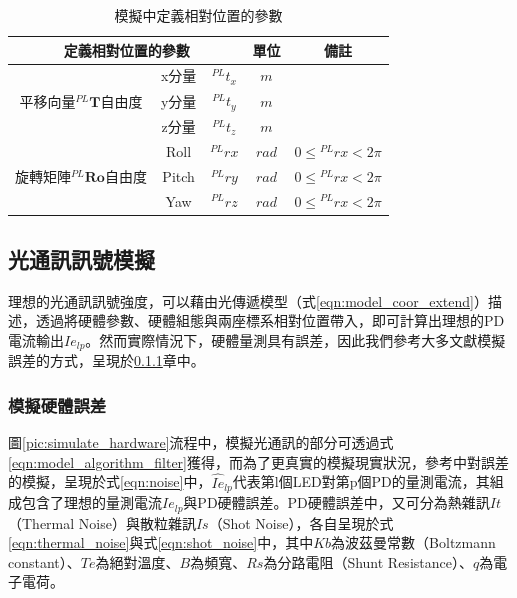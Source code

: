 \begin{table}[h]
    \renewcommand{\arraystretch}{1.3}
    \setlength{\arrayrulewidth}{0.15mm}
    \setlength{\doublerulesep}{0.12mm}
    \caption{模擬中定義相對位置的參數}
    \label{tab:para_relative}
    \centering
    \begin{tabular}{|c|cc|c|c|}
    \hline
    \multicolumn{3}{|c|}{\textbf{定義相對位置的參數}}  &\textbf{單位}  &  \textbf{備註}   \\
    \hline
    \multirow{3}{*}{平移向量$^{PL}\boldsymbol{T}$自由度} 
    & x分量 &$^{PL}t_x$ & $m$ &  \\
    & y分量 &$^{PL}t_y$ & $m$ &  \\
    & z分量 &$^{PL}t_z$ & $m$ &  \\
    \hline
    \multirow{3}{*}{旋轉矩陣$^{PL}\boldsymbol{Ro}$自由度} 
    & Roll &${^{PL}rx}$ & $rad$ &  $0\leq {^{PL}rx}<2\pi$\\
    & Pitch &$^{PL}ry$ & $rad$ & $0\leq {^{PL}rx}<2\pi$ \\
    & Yaw &$^{PL}rz$ & $rad$ & $0\leq {^{PL}rx}<2\pi$ \\
    \hline
    \end{tabular}
    \end{table}

\subsection{光通訊訊號模擬}
\label{chp:simulate_vlc}

    理想的光通訊訊號強度，可以藉由光傳遞模型（式\ref{eqn:model_coor_extend}）描述，透過將硬體參數、硬體組態與兩座標系相對位置帶入，即可計算出理想的PD電流輸出$Ie_{lp}$。然而實際情況下，硬體量測具有誤差，因此我們參考大多文獻模擬誤差的方式，呈現於\ref{chp:hardware_error}章中。

    \subsubsection{模擬硬體誤差}
    \label{chp:hardware_error}

    圖\ref{pic:simulate_hardware}流程中，模擬光通訊的部分可透過式\ref{eqn:model_algorithm_filter}獲得，而為了更真實的模擬現實狀況，參考\cite{survey_light2018}中對誤差的模擬，呈現於式\ref{eqn:noise}中，$\hat{Ie}_{lp}$代表第l個LED對第p個PD的量測電流，其組成包含了理想的量測電流$Ie_{lp}$與PD硬體誤差。PD硬體誤差中，又可分為熱雜訊$It$（Thermal Noise）與散粒雜訊$Is$（Shot Noise），各自呈現於式\ref{eqn:thermal_noise}與式\ref{eqn:shot_noise}中，其中$Kb$為波茲曼常數（Boltzmann constant）、$Te$為絕對溫度、$B$為頻寬、$Rs$為分路電阻（Shunt Resistance）、$q$為電子電荷。

